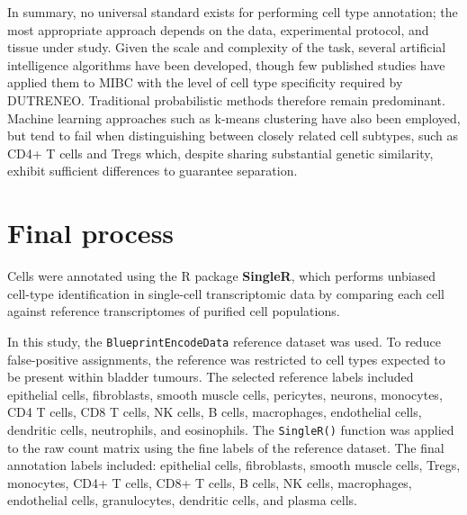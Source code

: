In summary, no universal standard exists for performing cell type annotation; the most appropriate approach depends on the data, experimental protocol, and tissue under study. Given the scale and complexity of the task, several artificial intelligence algorithms have been developed, though few published studies have applied them to MIBC with the level of cell type specificity required by DUTRENEO. Traditional probabilistic methods therefore remain predominant. Machine learning approaches such as k-means clustering have also been employed, but tend to fail when distinguishing between closely related cell subtypes, such as CD4+ T cells and Tregs which, despite sharing substantial genetic similarity, exhibit sufficient differences to guarantee separation.

\section{Final process}
Cells were annotated using the R package \textbf{SingleR}\cite{Aran.D}, which performs unbiased cell-type identification in single-cell transcriptomic data by comparing each cell against reference transcriptomes of purified cell populations.

In this study, the \texttt{BlueprintEncodeData} reference dataset was used. To reduce false-positive assignments, the reference was restricted to cell types expected to be present within bladder tumours. The selected reference labels included epithelial cells, fibroblasts, smooth muscle cells, pericytes, neurons, monocytes, CD4 T cells, CD8 T cells, NK cells, B cells, macrophages, endothelial cells, dendritic cells, neutrophils, and eosinophils. The \texttt{SingleR()} function was applied to the raw count matrix using the fine labels of the reference dataset. The final annotation labels included: epithelial cells, fibroblasts, smooth muscle cells, Tregs, monocytes, CD4+ T cells, CD8+ T cells, B cells, NK cells, macrophages, endothelial cells, granulocytes, dendritic cells, and plasma cells.

